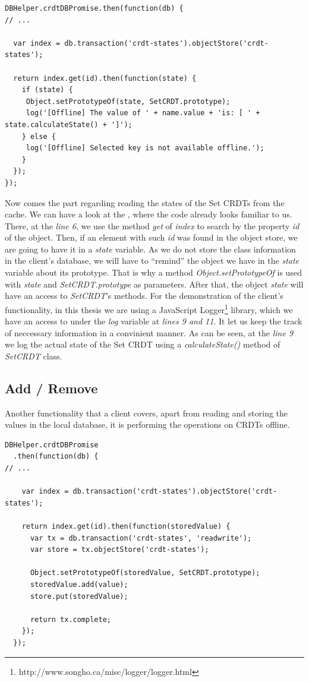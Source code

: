 \begin{lstlisting}[caption={Reading CRDT states from client's cache.}, label={lst:dev10}]
DBHelper.crdtDBPromise.then(function(db) {
// ...

  var index = db.transaction('crdt-states').objectStore('crdt-states');

  return index.get(id).then(function(state) {
    if (state) {
     Object.setPrototypeOf(state, SetCRDT.prototype);
     log('[Offline] The value of ' + name.value + 'is: [ ' + state.calculateState() + ']');
    } else {
     log('[Offline] Selected key is not available offline.');
    }
  });
});
\end{lstlisting}

Now comes the part regarding reading the states of the Set CRDTs from the cache. We can have a look at the , where the code already looks familiar to us. There, at the \textit{line 6}, we use the method \textit{get} of \textit{index} to search by the property \textit{id} of the object. Then, if an element with such \textit{id} was found in the object store, we are going to have it in a \textit{state} variable. As we do not store the class information in the client's database, we will have to ``remind'' the object we have in the \textit{state} variable about its prototype. That is why a method \textit{Object.setPrototypeOf} is used with \textit{state} and \textit{SetCRDT.prototype} as parameters. After that, the object \textit{state} will have an access to \textit{SetCRDT}'s methods. For the demonstration of the client's functionality, in this thesis we are using a JavaScript Logger\footnote{http://www.songho.ca/misc/logger/logger.html} library, which we have an access to under the \textit{log} variable at \textit{lines 9 and 11}. It let us keep the track of neccessary information in a convinient manner. As can be seen, at the \textit{line 9} we log the actual state of the Set CRDT using a \textit{calculateState()} method of \textit{SetCRDT} class.

\subsection*{Add / Remove}

Another functionality that a client covers, apart from reading and storing the values in the local database, it is performing the operations on CRDTs offline.

\begin{lstlisting}[caption={Performing an operation \textit{add} on a Set CRDT while the client is offline.}, label={lst:dev11}]
DBHelper.crdtDBPromise
  .then(function(db) {
// ...

    var index = db.transaction('crdt-states').objectStore('crdt-states');

    return index.get(id).then(function(storedValue) {
      var tx = db.transaction('crdt-states', 'readwrite');
      var store = tx.objectStore('crdt-states');

      Object.setPrototypeOf(storedValue, SetCRDT.prototype);
      storedValue.add(value);
      store.put(storedValue);

      return tx.complete;
    });
  });
\end{lstlisting}

